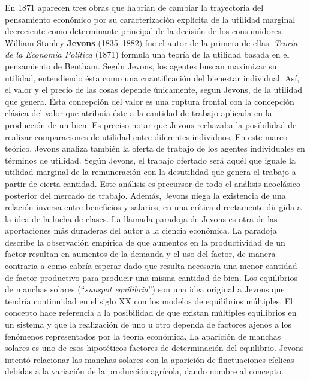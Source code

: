 \documentclass{nuevotema}
\begin{document}
En 1871 aparecen tres obras que habrían de cambiar la trayectoria del pensamiento económico por su caracterización explícita de la utilidad marginal decreciente como determinante principal de la decisión de los consumidores. William Stanley \textbf{Jevons} (1835--1882) fue el autor de la primera de ellas. \textit{Teoría de la Economía Política} (1871) formula una teoría de la utilidad basada en el pensamiento de Bentham. Según Jevons, los agentes buscan maximizar su utilidad, entendiendo ésta como una cuantificación del bienestar individual. Así, el valor y el precio de las cosas depende únicamente, segun Jevons, de la utilidad que genera. Ésta concepción del valor es una ruptura frontal con la concepción clásica del valor que atribuía éste a la cantidad de trabajo aplicada en la producción de un bien. Es preciso notar que Jevons rechazaba la posibilidad de realizar comparaciones de utilidad entre diferentes individuos. En este marco teórico, Jevons analiza también la oferta de trabajo de los agentes individuales en términos de utilidad. Según Jevons, el trabajo ofertado será aquél que iguale la utilidad marginal de la remuneración con la desutilidad que genera el trabajo a partir de cierta cantidad. Este análisis es precursor de todo el análisis neoclásico posterior del mercado de trabajo. Además, Jevons niega la existencia de una relación inversa entre beneficios y salarios, en una crítica directamente dirigida a la idea de la lucha de clases. La llamada paradoja de Jevons es otra de las aportaciones más duraderas del autor a la ciencia económica. La paradoja describe la observación empírica de que aumentos en la productividad de un factor resultan en aumentos de la demanda y el uso del factor, de manera contraria a como cabría esperar dado que resulta necesaria una menor cantidad de factor productivo para producir una misma cantidad de bien. Los equilibrios de manchas solares (``\textit{sunspot equilibria}'') son una idea original a Jevons que tendría continuidad en el siglo XX con los modelos de equilibrios múltiples. El concepto hace referencia a la posibilidad de que existan múltiples equilibrios en un sistema y que la realización de uno u otro dependa de factores ajenos a los fenómenos representados por la teoría económica. La aparición de manchas solares es uno de esos hipotéticos factores de determinación del equilibrio. Jevons intentó relacionar las manchas solares con la aparición de fluctuaciones cíclicas debidas a la variación de la producción agrícola, dando nombre al concepto.
\end{document}
